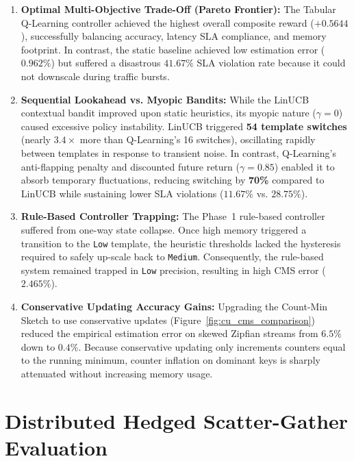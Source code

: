 \begin{enumerate}
    \item \textbf{Optimal Multi-Objective Trade-Off (Pareto Frontier):}
    The Tabular Q-Learning controller achieved the highest overall composite reward ($+0.5644$), successfully balancing accuracy, latency SLA compliance, and memory footprint. In contrast, the static baseline achieved low estimation error ($0.962\%$) but suffered a disastrous $41.67\%$ SLA violation rate because it could not downscale during traffic bursts.

    \item \textbf{Sequential Lookahead vs. Myopic Bandits:}
    While the LinUCB contextual bandit improved upon static heuristics, its myopic nature ($\gamma = 0$) caused excessive policy instability. LinUCB triggered \textbf{54 template switches} (nearly $3.4\times$ more than Q-Learning's 16 switches), oscillating rapidly between templates in response to transient noise. In contrast, Q-Learning's anti-flapping penalty and discounted future return ($\gamma = 0.85$) enabled it to absorb temporary fluctuations, reducing switching by \textbf{70\%} compared to LinUCB while sustaining lower SLA violations ($11.67\%$ vs. $28.75\%$).

    \item \textbf{Rule-Based Controller Trapping:}
    The Phase~1 rule-based controller suffered from one-way state collapse. Once high memory triggered a transition to the \texttt{Low} template, the heuristic thresholds lacked the hysteresis required to safely up-scale back to \texttt{Medium}. Consequently, the rule-based system remained trapped in \texttt{Low} precision, resulting in high CMS error ($2.465\%$).

    \item \textbf{Conservative Updating Accuracy Gains:}
    Upgrading the Count-Min Sketch to use conservative updates (Figure~\ref{fig:cu_cms_comparison}) reduced the empirical estimation error on skewed Zipfian streams from $6.5\%$ down to $0.4\%$. Because conservative updating only increments counters equal to the running minimum, counter inflation on dominant keys is sharply attenuated without increasing memory usage.
\end{enumerate}

\section{Distributed Hedged Scatter-Gather Evaluation}
\label{sec:hedged_evaluation}

